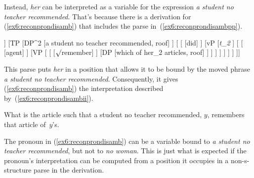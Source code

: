 Instead, \emph{her} can be interpreted as a variable for the expression \emph{a student no teacher recommended}. %
%
%
%
 That's because there is a derivation for (\ref{ex6:reconprondisamb}) that includes the parse in~(\ref{ex6:reconprondisambpp}).
\begin{exe}
\raggedright
	\ex \label{ex6:reconprondisambpp}%
	\small
	\begin{forest}
	[CP [\ibar{C}
		[\obar{C} [Q] ]
		[TP
			[DP^2 
				[a student no teacher recommended, roof]
			 ]
			[
				[ [did] ]
				[vP
					[\emph{t_2} ]
					[ 
						[ [agent] ]
						[VP [
							[ [$\surd$remember] ]
							[DP [which of her_2 articles, roof] ]
						] ]
					]
				 ]
			 ]
		 ]
	]]
	\end{forest}
\end{exe}
This parse puts \emph{her} in a position that allows it to be bound by the moved phrase \emph{a student no teacher recommended}.
%
%
%
Consequently, it gives (\ref{ex6:reconprondisamb}) the interpretation described by~(\ref{ex6:reconprondisambii}).
\begin{exe}
\raggedright
	\ex \label{ex6:reconprondisambii}
	What is the article such that a student no teacher recommended, $y$, remembers that article of~$y$'s.
\end{exe}
The pronoun in (\ref{ex6:reconprondisamb}) can be a variable bound to \emph{a student no teacher recommended}, but not to \emph{no woman}. This is just what is expected if the pronoun's interpretation can be computed from a position it occupies in a non-s-structure parse in the derivation.

